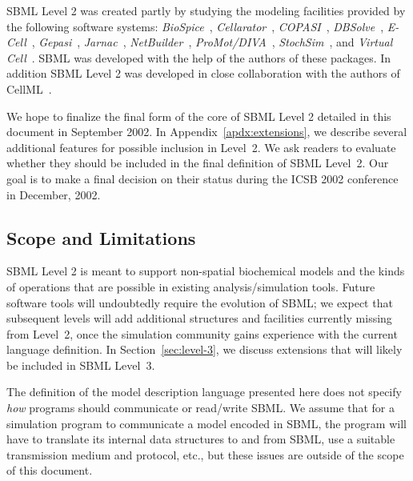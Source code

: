 \documentclass[10pt,twocolumntoc]{cekarticle}
\begin{document}
SBML Level 2 was created partly by studying the modeling facilities
provided by the following software systems:
\emph{BioSpice}~\citep{arkin:2001}, \emph{Cellarator}~\citep{shapiro:2000},
\emph{COPASI}~\citep{mendes:2000},
\emph{DBSolve}~\citep{goryanin:2001,goryanin:1999},
\emph{E-Cell}~\citep{tomita:1999,tomita:2001},
\emph{Gepasi}~\citep{mendes:1997,mendes:2001},
\emph{Jarnac}~\citep{sauro:2000,sauro:1991},
\emph{NetBuilder}~\citep{schilstra:2002},
\emph{ProMot/DIVA}~\citep{stelling:2001},
\emph{StochSim}~\citep{bray:2001,morton-firth:1998}, and \emph{Virtual
  Cell}~\citep{schaff:2000,schaff:2001}. SBML was developed with the help
of the authors of these packages.  In addition SBML Level 2 was developed
in close collaboration with the authors of CellML~\citep{Physiome:2001}.

We hope to finalize the final form of the core of SBML Level 2 detailed in
this document in September 2002.  In Appendix~\ref{apdx:extensions}, we
describe several additional features for possible inclusion in Level~2.
We ask readers to evaluate whether they should be included in the final
definition of SBML Level~2.  Our goal is to make a final decision on
their status during the ICSB 2002 conference in December, 2002.


\subsection{Scope and Limitations}

SBML Level 2 is meant to support non-spatial biochemical models
and the kinds of operations that are possible in existing
analysis/simulation tools.  Future software tools will undoubtedly require the
evolution of SBML; we expect that subsequent levels will add
additional structures and facilities currently missing from
Level~2, once the simulation community gains experience with the
current language definition. In Section~\ref{sec:level-3}, we
discuss extensions that will likely be included in SBML Level~3.

The definition of the model description language presented here does not
specify \emph{how} programs should communicate or read/write SBML.  We
assume that for a simulation program to communicate a model encoded in
SBML, the program will have to translate its internal data structures to
and from SBML, use a suitable transmission medium and protocol, etc., but
these issues are outside of the scope of this document.
\end{document}
